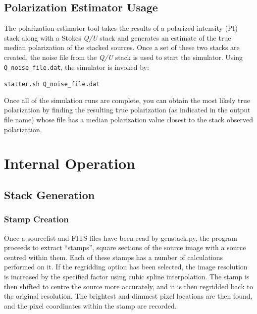 \documentclass{article}
\begin{document}
\subsection{Polarization Estimator Usage}
The polarization estimator tool takes the results of a polarized intensity (PI)
stack along with a Stokes \emph{Q/U} stack and generates an estimate of the 
true median polarization of the stacked sources.  Once a set of these two 
stacks are created, the noise file from the \emph{Q/U} stack is used to start 
the simulator.  Using \verb!Q_noise_file.dat!, the simulator is invoked by:
\begin{center}
\verb!statter.sh Q_noise_file.dat!\\
\end{center}
\par
Once all of the simulation runs are complete, you can obtain the most likely 
true polarization by finding the resulting true polarization (as indicated
in the output file name) whose file has a median polarization value closest to 
the stack observed polarization.

\section{Internal Operation}

\subsection{Stack Generation}

\subsubsection{Stamp Creation}
Once a sourcelist and FITS files have been read by genstack.py, the program 
proceeds to extract ``stamps'', square sections of the source image with a 
source centred within them.  Each of these stamps has a number of calculations 
performed on it.  If the regridding option has been selected, the image 
resolution is increased by the specified factor using cubic spline 
interpolation.  The stamp is then shifted to centre the source more 
accurately, and it is then regridded back to the original resolution. The 
brightest and dimmest pixel locations are then found, and the pixel coordinates
within the stamp are recorded. \par
\end{document}
